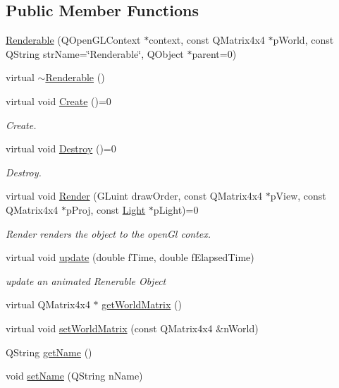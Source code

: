 \subsection*{Public Member Functions}
\begin{DoxyCompactItemize}
\item 
\hyperlink{class_renderable_aec20cb09808c028d3d024e02b86e0272}{Renderable} (Q\+Open\+G\+L\+Context $\ast$context, const Q\+Matrix4x4 $\ast$p\+World, const Q\+String str\+Name=\char`\"{}Renderable\char`\"{}, Q\+Object $\ast$parent=0)
\item 
virtual \hyperlink{class_renderable_a4c9e03ac345df99a010c2ad9f8632af2}{$\sim$\+Renderable} ()
\item 
virtual void \hyperlink{class_renderable_ab204246b39a34b14a3f258a065cc3019}{Create} ()=0
\begin{DoxyCompactList}\small\item\em Create. \end{DoxyCompactList}\item 
virtual void \hyperlink{class_renderable_aaf8e0b324e35f8a1b61a9667a0d91d51}{Destroy} ()=0
\begin{DoxyCompactList}\small\item\em Destroy. \end{DoxyCompactList}\item 
virtual void \hyperlink{class_renderable_aee9a55d459edefe6c8b8532ab5d7102c}{Render} (G\+Luint draw\+Order, const Q\+Matrix4x4 $\ast$p\+View, const Q\+Matrix4x4 $\ast$p\+Proj, const \hyperlink{class_light}{Light} $\ast$p\+Light)=0
\begin{DoxyCompactList}\small\item\em Render renders the object to the open\+Gl contex. \end{DoxyCompactList}\item 
virtual void \hyperlink{class_renderable_ac3bc83ee89ef2a6523277ba74fdcf0a8}{update} (double f\+Time, double f\+Elapsed\+Time)
\begin{DoxyCompactList}\small\item\em update an animated Renerable Object \end{DoxyCompactList}\item 
virtual Q\+Matrix4x4 $\ast$ \hyperlink{class_renderable_ac2098bbc9937aff7099d36c6b425c2a2}{get\+World\+Matrix} ()
\item 
virtual void \hyperlink{class_renderable_ad5f7e6f7ef8e555be642c1e311656b45}{set\+World\+Matrix} (const Q\+Matrix4x4 \&n\+World)
\item 
Q\+String \hyperlink{class_renderable_a844b90c20cad45b553390cfed94f4517}{get\+Name} ()
\item 
void \hyperlink{class_renderable_a772b6d4edbff1d75922dab9476828bb5}{set\+Name} (Q\+String n\+Name)
\end{DoxyCompactItemize}
